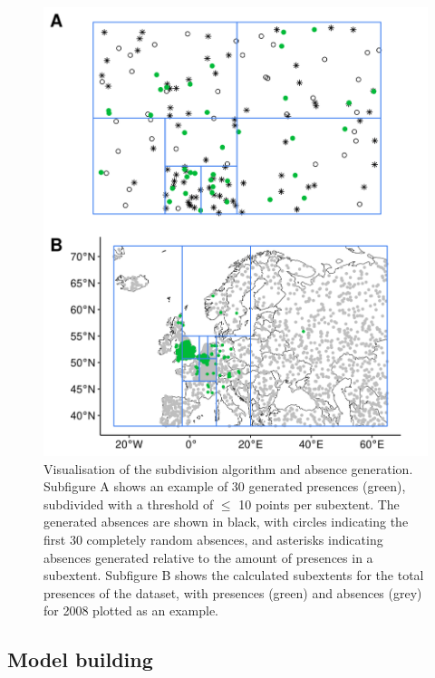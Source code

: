 \documentclass[12pt,a4paper]{article}
\begin{document}
\begin{figure}[!h]
    \centering
    \includegraphics[width = 0.8\linewidth]{"../../R/figures/ext-subdiv.png"}
    \caption{\label{fig:ext_subdiv} Visualisation of the subdivision algorithm and absence generation. Subfigure A shows an example of 30 generated presences (green), subdivided with a threshold of $\leq$ 10 points per subextent. The generated absences are shown in black, with circles indicating the first 30 completely random absences, and asterisks indicating absences generated relative to the amount of presences in a subextent. Subfigure B shows the calculated subextents for the total presences of the dataset, with presences (green) and absences (grey) for 2008 plotted as an example.}
\end{figure}

\subsection{Model building} \label{ssec:modelbuilding}
\end{document}
